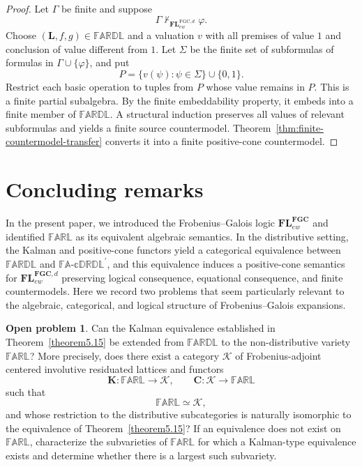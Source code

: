 \documentclass[final,12pt,times]{elsarticle}
\theoremstyle{plain}
\theoremstyle{definition}
\newtheorem{openproblem}[definition]{Open problem}
\theoremstyle{break}
\newcommand{\FARL}{\mathbb{FARL}}
\newcommand{\FARDL}{\mathbb{FARDL}}
\newcommand{\CFADp}{\mathbb{FA\text{-}cDRDL}^{\prime}}
\begin{document}
\begin{proof}
Let \(\Gamma\) be finite and suppose
\[
 \Gamma\nvdash_{\mathbf{FL}^{\mathrm{FGC},d}_{ew}}\varphi.
\]
Choose \((\mathbf L,f,g)\in\FARDL\) and a valuation \(v\) with all premises
of value \(1\) and conclusion of value different from \(1\).  Let \(\Sigma\)
be the finite set of subformulas of formulas in
\(\Gamma\cup\{\varphi\}\), and put
\[
 P=\{v(\psi):\psi\in\Sigma\}\cup\{0,1\}.
\]
Restrict each basic operation to tuples from \(P\) whose value remains in
\(P\).  This is a finite partial subalgebra.  By the finite embeddability
property, it embeds into a finite member of \(\FARDL\).  A structural
induction preserves all values of relevant subformulas and yields a finite
source countermodel.  Theorem~\ref{thm:finite-countermodel-transfer} converts
it into a finite positive-cone countermodel.
\end{proof}


\section{Concluding remarks}

In the present paper, we introduced the Frobenius--Galois logic $\mathbf{FL}^{\mathbf{FGC}}_{ew}$ and identified $\FARL$ as its equivalent algebraic semantics. In the distributive setting, the Kalman and positive-cone functors yield a categorical equivalence between $\FARDL$ and $\CFADp$, and this equivalence induces a positive-cone semantics for $\mathbf{FL}^{\mathbf{FGC},d}_{ew}$ preserving logical consequence, equational consequence, and finite countermodels.  Here we record two problems that seem particularly relevant to the algebraic, categorical, and logical structure of Frobenius--Galois expansions.

\begin{openproblem}\label{op:nondistributive-Kalman}
Can the Kalman equivalence established in Theorem~\ref{theorem5.15}
be extended from $\FARDL$ to the non-distributive variety $\FARL$?
More precisely, does there exist a category $\mathcal K$ of 
 Frobenius-adjoint centered involutive  residuated lattices and functors
\[
\mathbf K:\FARL\longrightarrow\mathcal K,
\qquad
\mathbf C:\mathcal K\longrightarrow\FARL
\]
such that
\[
\FARL\simeq\mathcal K,
\]
and whose restriction to the distributive subcategories is naturally
isomorphic to the equivalence of Theorem~\ref{theorem5.15}? If an
equivalence does not exist on $\FARL$, characterize the
subvarieties of $\FARL$ for which a Kalman-type equivalence exists and
determine whether there is a largest such subvariety.
\end{openproblem}
\end{document}
